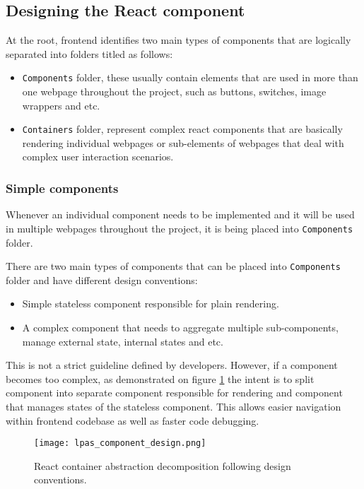 \subsection{Designing the React component}

At the root, \lpa{} frontend identifies two main types of components that are logically separated into folders titled as follows:
\begin{itemize}
	\item \texttt{Components} folder, these usually contain elements that are used in more than one webpage throughout the project, such as buttons, switches, image wrappers and etc.
	\item \texttt{Containers} folder, represent complex react components that are basically rendering individual webpages or sub-elements of webpages that deal with complex user interaction scenarios.
\end{itemize}

\subsubsection{Simple components}

Whenever an individual component needs to be implemented and it will be used in multiple webpages throughout the project, it is being placed into \texttt{Components} folder.

There are two main types of components that can be placed into \texttt{Components} folder and have different design conventions:
\begin{itemize}
	\item Simple stateless component responsible for plain rendering.
	\item A complex component that needs to aggregate multiple sub-components, manage external state, internal states and etc.
\end{itemize}


This is not a strict guideline defined by \lpa{} developers. However, if a component becomes too complex, as demonstrated on figure \ref{fig:lpas_component_design} the intent is to split component into separate component responsible for rendering and component that manages states of the stateless component. This allows easier navigation within frontend codebase as well as faster code debugging. 

\begin{figure}[h]
\centering
\texttt{[image: lpas\_component\_design.png]}
\caption{React container abstraction decomposition following \lpas{} design conventions.}
\label{fig:lpas_component_design}
\end{figure}

